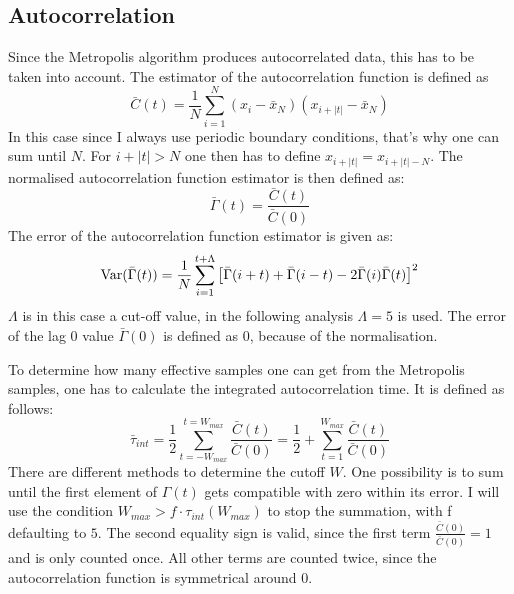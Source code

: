 \documentclass{scrartcl}
\begin{document}
	\subsection{Autocorrelation}
		Since the Metropolis algorithm produces autocorrelated data, this has to be taken into account.
		The estimator of the autocorrelation function is defined as
		\begin{equation}
			\bar C(t) = \frac 1{N} \sum_{i = 1}^{N} (x_i - \bar x_N)(x_{i + |t|} - \bar x_N)
			\label{eq:autocorrelation}
		\end{equation}
		In this case since I always use periodic boundary conditions, that's why one can sum until $N$.
		For $i + |t| > N$ one then has to define $x_{i + |t|} = x_{i + |t| - N}$.
		The normalised autocorrelation function estimator is then defined as:
		\begin{equation}
			\bar\Gamma(t) = \frac {\bar C(t)}{\bar C(0)}
			\label{eq:normalised_autocorrelation}
		\end{equation}
		The error of the autocorrelation function estimator is given as:
		\begin{equation}
			\operatorname{Var}(\bar\Gamma(t)) = \frac 1N \sum_{i=1}^{t + \Lambda}\left[\bar\Gamma(i + t) + \bar\Gamma(i - t) - 2 \bar\Gamma(i)\bar\Gamma(t)\right]^2
			\label{eq:normalised_autocorrelation_error}
		\end{equation}
		$\Lambda$ is in this case a cut-off value, in the following analysis $\Lambda = 5$ is used.
		The error of the lag 0 value $\bar\Gamma(0)$ is defined as 0, because of the normalisation.

		To determine how many effective samples one can get from the Metropolis samples, one has to calculate the integrated autocorrelation time.
		It is defined as follows:
		\begin{equation}
			\bar \tau_{int} = \frac 12 \sum_{t = -W_{max}}^{t = W_{max}} \frac {\bar C(t)}{\bar C(0)} = \frac 12 + \sum_{t = 1}^{W_{max}} \frac {\bar C(t)}{\bar C(0)}
			\label{eq:integrated_autocorrelation}
		\end{equation}
		There are different methods to determine the cutoff $W$.
		One possibility is to sum until the first element of $\Gamma(t)$ gets compatible with zero within its error.
		I will use the condition $W_{max} > f \cdot \tau_{int}(W_{max})$ to stop the summation, with f defaulting to $5$.
		The second equality sign is valid, since the first term $\frac {\bar C(0)}{\bar C(0)} = 1$ and is only counted once.
		All other terms are counted twice, since the autocorrelation function is symmetrical around 0.
\end{document}

